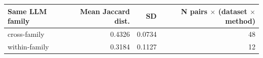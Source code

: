 \begin{tabular}{lrrr}
\toprule
Same LLM family & Mean Jaccard dist. & SD & N pairs $\times$ (dataset $\times$ method) \\
\midrule
cross-family & 0.4326 & 0.0734 & 48 \\
within-family & 0.3184 & 0.1127 & 12 \\
\bottomrule
\end{tabular}